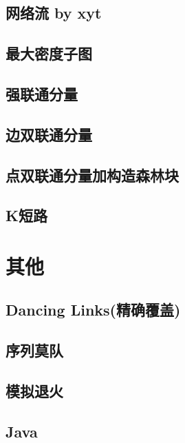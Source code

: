 \documentclass[11pt]{article}
\begin{document}
		\subsection{网络流 by xyt}
		
		\subsection{最大密度子图}
		
		\subsection{强联通分量}
		
		\subsection{边双联通分量}
		
		\subsection{点双联通分量加构造森林块}
		
		\subsection{K短路}
		
	\section{其他}
		\subsection{Dancing Links(精确覆盖)}
		
		\subsection{序列莫队}
		
		\subsection{模拟退火}
		
		\subsection{Java}
		
\end{document}
